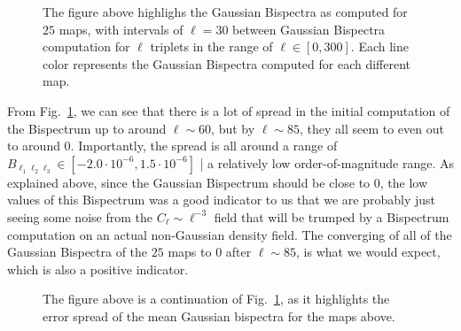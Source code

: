 \documentclass[11pt]{article}
\renewcommand{\_}[1]{\underline{ #1 }}
\begin{document}
{\begin{figure}[H]
    \centering
    \caption{The figure above highlighs the Gaussian Bispectra as computed for $25$ maps, with intervals of $\ell = 30$ between Gaussian Bispectra computation for $\ell$ triplets in the range of $\ell \in [0,300]$. Each line color represents the Gaussian Bispectra computed for each different map.}\label{fig:25maps}
\end{figure}

From Fig.~\ref{fig:25maps}, we can see that there is a lot of spread in the initial computation of the Bispectrum up to around $\ell \sim 60$, but by $\ell \sim 85$, they all seem to even out to around 0. Importantly, the spread is all around a range of $B_{\ell_1 \ell_2 \ell_3} \in [-2.0\cdot 10^{-6}, 1.5 \cdot 10^{-6}]$ | a relatively low order-of-magnitude range. As explained above, since the Gaussian Bispectrum should be close to $0$, the low values of this Bispectrum was a good indicator to us that we are probably just seeing some noise from the $C_{\ell} \sim \ell^{-3}$ field that will be trumped by a Bispectrum computation on an actual non-Gaussian density field. The converging of all of the Gaussian Bispectra of the $25$ maps to 0 after $\ell \sim 85$, is what we would expect, which is also a positive indicator.

\begin{figure}[H]
    \centering
    \caption{The figure above is a continuation of Fig.~\ref{fig:25maps}, as it highlights the error spread of the mean Gaussian bispectra for the maps above.}\label{fig:errorspread}
\end{figure}

}
\end{document}
